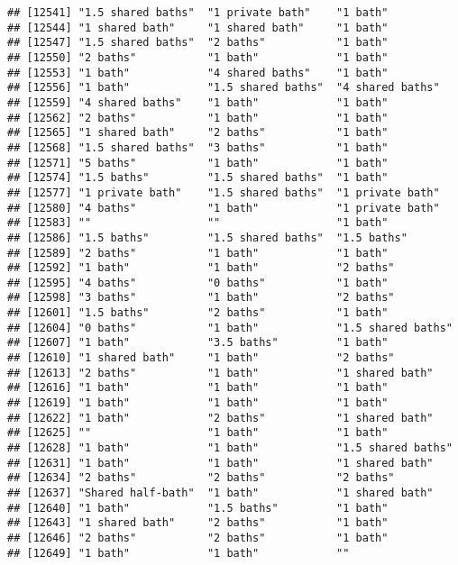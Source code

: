 \documentclass[
]{article}
\begin{document}
\begin{verbatim}
## [12541] "1.5 shared baths"  "1 private bath"    "1 bath"           
## [12544] "1 shared bath"     "1 shared bath"     "1 bath"           
## [12547] "1.5 shared baths"  "2 baths"           "1 bath"           
## [12550] "2 baths"           "1 bath"            "1 bath"           
## [12553] "1 bath"            "4 shared baths"    "1 bath"           
## [12556] "1 bath"            "1.5 shared baths"  "4 shared baths"   
## [12559] "4 shared baths"    "1 bath"            "1 bath"           
## [12562] "2 baths"           "1 bath"            "1 bath"           
## [12565] "1 shared bath"     "2 baths"           "1 bath"           
## [12568] "1.5 shared baths"  "3 baths"           "1 bath"           
## [12571] "5 baths"           "1 bath"            "1 bath"           
## [12574] "1.5 baths"         "1.5 shared baths"  "1 bath"           
## [12577] "1 private bath"    "1.5 shared baths"  "1 private bath"   
## [12580] "4 baths"           "1 bath"            "1 private bath"   
## [12583] ""                  ""                  "1 bath"           
## [12586] "1.5 baths"         "1.5 shared baths"  "1.5 baths"        
## [12589] "2 baths"           "1 bath"            "1 bath"           
## [12592] "1 bath"            "1 bath"            "2 baths"          
## [12595] "4 baths"           "0 baths"           "1 bath"           
## [12598] "3 baths"           "1 bath"            "2 baths"          
## [12601] "1.5 baths"         "2 baths"           "1 bath"           
## [12604] "0 baths"           "1 bath"            "1.5 shared baths" 
## [12607] "1 bath"            "3.5 baths"         "1 bath"           
## [12610] "1 shared bath"     "1 bath"            "2 baths"          
## [12613] "2 baths"           "1 bath"            "1 shared bath"    
## [12616] "1 bath"            "1 bath"            "1 bath"           
## [12619] "1 bath"            "1 bath"            "1 bath"           
## [12622] "1 bath"            "2 baths"           "1 shared bath"    
## [12625] ""                  "1 bath"            "1 bath"           
## [12628] "1 bath"            "1 bath"            "1.5 shared baths" 
## [12631] "1 bath"            "1 bath"            "1 shared bath"    
## [12634] "2 baths"           "2 baths"           "2 baths"          
## [12637] "Shared half-bath"  "1 bath"            "1 shared bath"    
## [12640] "1 bath"            "1.5 baths"         "1 bath"           
## [12643] "1 shared bath"     "2 baths"           "1 bath"           
## [12646] "2 baths"           "2 baths"           "1 bath"           
## [12649] "1 bath"            "1 bath"            ""                 

\end{verbatim}
\end{document}
